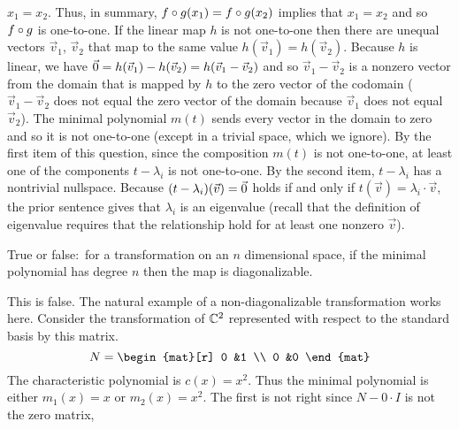 \begin{exercises}
\begin{answer}
\begin{exparts}
          $x_1=x_2$.
          Thus, in summary, $f\mathbin\circ g(x_1)=f\mathbin\circ g(x_2)$
          implies that $x_1=x_2$ and so $f\mathbin\circ g$ is one-to-one.
        \partsitem If the linear map $h$ 
          is not one-to-one then there are unequal
          vectors $\vec{v}_1$, $\vec{v}_2$ that map to the same value
          $h(\vec{v}_1)=h(\vec{v}_2)$.
          Because $h$ is linear, we have
          $\vec{0}=h(\vec{v}_1)-h(\vec{v}_2)=h(\vec{v}_1-\vec{v}_2)$
          and so $\vec{v}_1-\vec{v}_2$ is a nonzero vector from the domain
          that is mapped by $h$ to the zero vector of the codomain  
          ($\vec{v}_1-\vec{v}_2$
          does not equal the zero vector of the domain because $\vec{v}_1$
          does not equal $\vec{v}_2$).
        \partsitem The minimal polynomial 
          $m(t)$ sends every vector in the domain to 
          zero and so it is not one-to-one (except in a trivial space, which 
          we ignore).
          By the first item of this question, 
          since the composition $m(t)$ is not one-to-one, 
          at least one of the components $t-\lambda_i$ is not one-to-one.
          By the second item, $t-\lambda_i$ has a nontrivial nullspace.
          Because $(t-\lambda_i)(\vec{v})=\vec{0}$ holds if and only if
          $t(\vec{v})=\lambda_i\cdot\vec{v}$, the prior sentence gives that
          $\lambda_i$ is an eigenvalue (recall that the definition of
          eigenvalue requires that the relationship hold for at least one
          nonzero $\vec{v}$).
      \end{exparts}
    \end{answer}
  \item 
    True or false:~for a transformation on an
    \( n \) dimensional space, if the minimal polynomial has degree \( n \) 
    then the map is diagonalizable.
    \begin{answer}
      This is false.
      The natural example of a non-diagonalizable transformation works here.
      Consider the transformation of $\mathbb{C}^2$ represented with respect to
      the standard basis by this matrix.
      \begin{equation*}
        N=
        \begin{mat}[r]
          0  &1  \\
          0  &0
        \end{mat}
      \end{equation*}
      The characteristic polynomial is $c(x)=x^2$. 
      Thus the minimal polynomial is either $m_1(x)=x$ or $m_2(x)=x^2$.
      The first is not right since $N-0\cdot I$ is not the zero matrix,

\end{answer}
\end{exercises}
